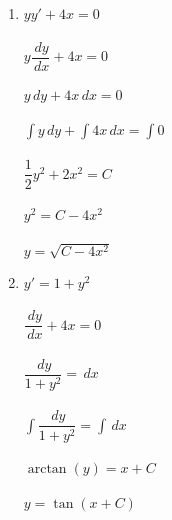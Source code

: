 \begin{enumerate}[1.]

	\item \begin{math} yy' + 4x = 0 \end{math}\\ \\
	         \begin{math} y \dfrac{\, dy}{\, dx} + 4x = 0 \end{math}\\ \\
	         \begin{math} y \, dy + 4x \, dx = 0 \end{math}\\ \\
	         \begin{math} \int y \, dy + \int 4x \, dx = \int 0 \end{math}\\ \\
	         \begin{math} \dfrac{1}{2}y^{2} + 2x^{2} = C \end{math}\\ \\
	         \begin{math} y^{2} = C - 4x^{2} \end{math}\\ \\
	         \begin{math} y = \sqrt{C - 4x^{2}}\end{math}
	         
	\item \begin{math} y' = 1 + y^{2} \end{math} \\ \\
	         \begin{math} \dfrac{\, dy}{\, dx} + 4x = 0 \end{math}\\ \\
	         \begin{math} \dfrac{\, dy}{1 + y^{2}} = \, dx \end{math}\\ \\
	         \begin{math} \int \dfrac{\, dy}{1 + y^{2}} = \int \, dx \end{math}\\ \\
	         \begin{math}\arctan(y) = x + C \end{math}\\ \\
	         \begin{math} y = \tan (x + C) \end{math}

\end{enumerate}

